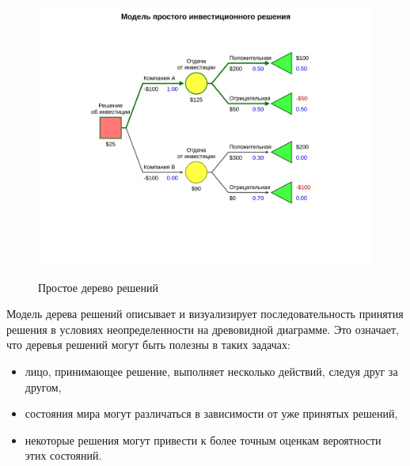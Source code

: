 \begin{figure}[h!]
	\includegraphics[width= 15cm]{pics/simple_decision_tree_1.png} 
	\label{fig:sample}
	\caption{Простое дерево решений}
\end{figure}

Модель дерева решений описывает и визуализирует последовательность принятия решения в условиях неопределенности на древовидной диаграмме. Это означает, что деревья решений могут быть полезны в таких задачах:
\begin{itemize}
    \item лицо, принимающее решение, выполняет несколько действий, следуя друг за другом,
    \item состояния мира могут различаться в зависимости от уже принятых решений,
    \item некоторые решения могут привести к более точным оценкам вероятности этих состояний.
\end{itemize}

